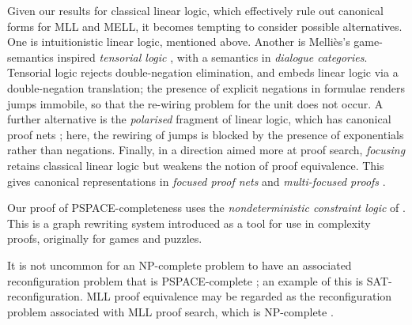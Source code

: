 \documentclass{lmcs}
\let\capsabbrev=\uppercase
\begin{document}


Given our results for classical linear logic, which effectively rule out canonical forms for \capsabbrev{mll} and \capsabbrev{mell}, it becomes tempting to consider possible alternatives. One is intuitionistic linear logic, mentioned above. Another is Melli\`es's game-semantics inspired \emph{tensorial logic} \cite{Mellies-2012}, with a semantics in \emph{dialogue categories}. Tensorial logic rejects double-negation elimination, and embeds linear logic via a double-negation translation; the presence of explicit negations in formulae renders jumps immobile, so that the re-wiring problem for the unit does not occur. A further alternative is the \emph{polarised} fragment of linear logic, which has canonical proof nets \cite{Laurent-1999}; here, the rewiring of jumps is blocked by the presence of exponentials rather than negations. Finally, in a direction aimed more at proof search, \emph{focusing} retains classical linear logic but weakens the notion of proof equivalence. This gives canonical representations in \emph{focused proof nets} \cite{Andreoli-Maieli-1999} and \emph{multi-focused proofs} \cite{Chaudhuri-Miller-Saurin-2008}.



Our proof of \capsabbrev{pspace}-completeness uses the \emph{nondeterministic constraint logic} of \cite{Hearn-Demaine-2005,Demaine-Hearn-2008,GamesPuzzlesAndComputation}. This is a graph rewriting
system introduced as a tool for use in complexity proofs, originally for games and puzzles.

It is not uncommon for an \capsabbrev{np}-complete problem to have an associated reconfiguration problem that is \capsabbrev{pspace}-complete \cite{ReconfigurationProblems}; an example of this is \capsabbrev{sat}-reconfiguration. \capsabbrev{mll} proof equivalence may be regarded as the reconfiguration problem associated with \capsabbrev{mll} proof search, which is \capsabbrev{np}-complete \cite{Kanovich-1992,Lincoln-Winkler-1994}.

\end{document}
